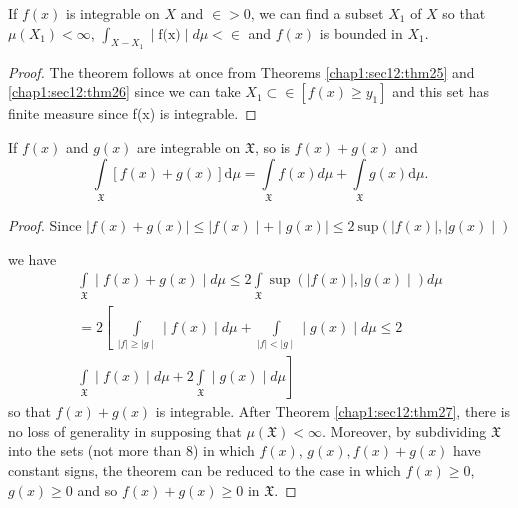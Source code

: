 \begin{theorem}\label{chap1:sec12:thm27} 
  If $f(x)$ is integrable on $X$ and $\in > 0$, we can find a subset
  $X_1$ of $X$ so that $\mu (X_1) < \infty$, $\int_{X-X_{1}}\mid
  \text{f(x)}\mid d \mu < \in$ and $f(x)$ is bounded in $X_1$. 
\end{theorem}

\begin{proof}
  The theorem follows at once from Theorems \ref{chap1:sec12:thm25}
  and \ref{chap1:sec12:thm26}   since we can take
  $ X_1 \subset \in [f(x) \geq y_1]$ and this set has finite measure
  since f(x) is integrable. 
\end{proof}

\begin{theorem}\label{chap1:sec12:thm28} 
  If $f(x)$ and $g(x)$ are integrable on $\mathfrak{X}$, so is $f(x) + g(x)$ and
  $$
  \int\limits_{\mathfrak{X} }[f(x)+g(x)]\text {d}\mu  = 
  \int\limits_{\mathfrak{X}}f(x)d \mu + 
  \int\limits_{\mathfrak{X}}g(x)\text {d}\mu.  
  $$
\end{theorem}

\begin{proof}
  Since $\mid f(x) + g(x)\mid\leq\mid f(x)\mid + \mid g(x) \mid \leq 2
~\text{sup}(\mid f(x)\mid,\mid g(x)\mid) $ 

we have 
\begin{multline*}
\int\limits_{\mathfrak{X}}\mid f(x) + g(x)\mid d\mu 
\leq 2 \int\limits_{\mathfrak{X}} \sup(\mid f(x)\mid , \mid g(x)\mid)
d \mu\\
= 2\left[~\int\limits_{\mid f \mid \geq \mid g \mid}\mid f(x) \mid 
  d\mu +\int \limits_{\mid f \mid < \mid g \mid}\mid g(x) \mid 
  d\mu \leq 2 \right.\\
  \left.\int \limits_{\mathfrak{X}} \mid f(x)\mid d \mu +
  2 \int\limits_{\mathfrak{X}}\mid g(x)\mid d \mu\right]
\end{multline*}
so that $f(x) + g(x)$ is integrable. After Theorem \ref{chap1:sec12:thm27}, there is no loss
of generality in supposing that $\mu (\mathfrak{X})< \infty$. Moreover,
by subdividing $\mathfrak{X}$ into the sets (not more than 8) in which
$f(x)$, $g(x),f(x)+g(x)$ have constant signs, the theorem can be reduced to
the case in which  
$f(x)\geq 0$, $g(x) \geq 0$ and so $f(x) + g(x) \geq 0$ in $\mathfrak{X}$.
\end{proof}

